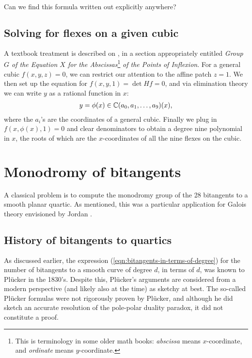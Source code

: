 \documentclass[11pt]{amsart}
\begin{document}
\begin{question} Can we find this formula written out explicitly anywhere?
\end{question}

\subsection{Solving for flexes on a given cubic}

A textbook treatment is described on \cite[p.~333]{MillerBlichfeldtDickson}, in a section appropriately entitled \emph{Group $G$ of the Equation $X$ for the Abscissas}\footnote{This is terminology in some older math books: \textit{abscissa} means $x$-coordinate, and \textit{ordinate} means $y$-coordinate.} \emph{of the Points of Inflexion}. For a general cubic $f(x,y,z)=0$, we can restrict our attention to the affine patch $z=1$. We then set up the equation for $f(x,y,1)=\det Hf = 0$, and via elimination theory we can write $y$ as a rational function in $x$:
\begin{align*}
    y = \phi(x) \in \mathbb{C}(a_0,a_1, \ldots, a_9)(x),
\end{align*}
where the $a_i$'s are the coordinates of a general cubic. Finally we plug in $f(x,\phi(x),1) =0$ and clear denominators to obtain a degree nine polynomial in $x$, the roots of which are the $x$-coordinates of all the nine flexes on the cubic.


\section{Monodromy of bitangents}

A classical problem is to compute the monodromy group of the 28 bitangents to a smooth planar quartic. As mentioned, this was a particular application for Galois theory envisioned by Jordan \cite[III.VI]{Jordan}.

\subsection{History of bitangents to quartics}

As discussed earlier, the expression (\autoref{eqn:bitangents-in-terms-of-degree}) for the number of bitangents to a smooth curve of degree $d$, in terms of $d$, was known to Pl\"{u}cker in the 1830's. Despite this, Pl\"{u}cker's arguments are considered from a modern perspective (and likely also at the time) as sketchy at best. The so-called Pl\"{u}cker formulas were not rigorously proven by Pl\"{u}cker, and although he did sketch an accurate resolution of the pole-polar duality paradox, it did not constitute a proof.
\end{document}
